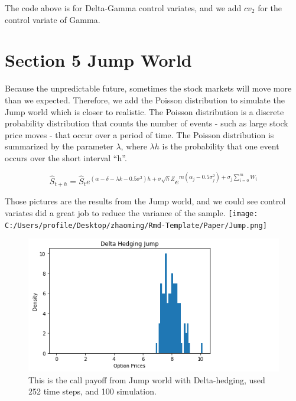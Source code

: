 \documentclass[11pt,]{article}
\makeatletter
\def\maxwidth{\ifdim\Gin@nat@width>\linewidth\linewidth
\else\Gin@nat@width\fi}
\let\Oldincludegraphics\includegraphics
\renewcommand{\includegraphics}[1]{\Oldincludegraphics[width=\maxwidth]{#1}}
\makeatother
\begin{document}
The code above is for Delta-Gamma control variates, and we add \(cv_2\)
for the control variate of Gamma.

\hypertarget{section-5-jump-world}{%
\section{Section 5 Jump World}\label{section-5-jump-world}}

Because the unpredictable future, sometimes the stock markets will move
more than we expected. Therefore, we add the Poisson distribution to
simulate the Jump world which is closer to realistic. The Poisson
distribution is a discrete probability distribution that counts the
number of events - such as large stock price moves - that occur over a
period of time. The Poisson distribution is summarized by the parameter
\(\lambda\), where \(\lambda h\) is the probability that one event
occurs over the short interval ``h''.

\[
\hat{S}_{t+h} = \hat{S}_te^{(\alpha-\delta-\lambda k - 0.5\sigma^2)h+\sigma\sqrt hZ}e^{m(\alpha_j-0.5\sigma^2_j)+\sigma_j\sum^m_{i=0}W_i}
\]

Those pictures are the results from the Jump world, and we could see
control variates did a great job to reduce the variance of the sample.
\texttt{[image: C:/Users/profile/Desktop/zhaoming/Rmd-Template/Paper/Jump.png]}

\begin{figure}
\centering
\includegraphics{images/DeltaHedgingJump.PNG}
\caption{This is the call payoff from Jump world with Delta-hedging,
used 252 time steps, and 100 simulation.}
\end{figure}
\end{document}
